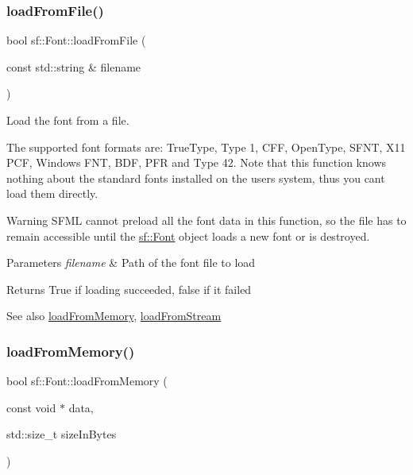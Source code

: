 \subsubsection{\texorpdfstring{loadFromFile()}{loadFromFile()}}
{\footnotesize\ttfamily bool sf\+::\+Font\+::load\+From\+File (\begin{DoxyParamCaption}\item[{const std\+::string \&}]{filename }\end{DoxyParamCaption})}



Load the font from a file. 

The supported font formats are\+: True\+Type, Type 1, C\+FF, Open\+Type, S\+F\+NT, X11 P\+CF, Windows F\+NT, B\+DF, P\+FR and Type 42. Note that this function knows nothing about the standard fonts installed on the user\textquotesingle{}s system, thus you can\textquotesingle{}t load them directly.

\begin{DoxyWarning}{Warning}
S\+F\+ML cannot preload all the font data in this function, so the file has to remain accessible until the \mbox{\hyperlink{classsf_1_1_font}{sf\+::\+Font}} object loads a new font or is destroyed.
\end{DoxyWarning}

\begin{DoxyParams}{Parameters}
{\em filename} & Path of the font file to load\\
\hline
\end{DoxyParams}
\begin{DoxyReturn}{Returns}
True if loading succeeded, false if it failed
\end{DoxyReturn}
\begin{DoxySeeAlso}{See also}
\mbox{\hyperlink{classsf_1_1_font_abf2f8d6de31eb4e1db02e061c323e346}{load\+From\+Memory}}, \mbox{\hyperlink{classsf_1_1_font_abc3f37a354ce8b9a21f8eb93bd9fdafb}{load\+From\+Stream}} \begin{DoxyVerb}\end{DoxyVerb}
 
\end{DoxySeeAlso}
\mbox{\label{classsf_1_1_font_abf2f8d6de31eb4e1db02e061c323e346}} 
\subsubsection{\texorpdfstring{loadFromMemory()}{loadFromMemory()}}
{\footnotesize\ttfamily bool sf\+::\+Font\+::load\+From\+Memory (\begin{DoxyParamCaption}\item[{const void $\ast$}]{data,  }\item[{std\+::size\+\_\+t}]{size\+In\+Bytes }\end{DoxyParamCaption})}



